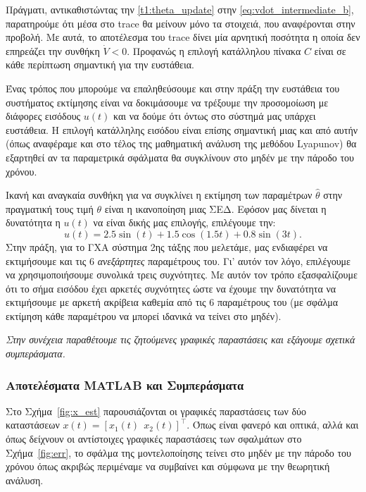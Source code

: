 \documentclass[12pt]{article} %
\numberwithin{equation}{section}  %
\begin{document}
Πράγματι, αντικαθιστώντας την \eqref{t1:theta_update} στην \eqref{eq:vdot_intermediate_b}, παρατηρούμε ότι μέσα στο trace θα μείνουν μόνο τα στοιχειά, που αναφέρονται στην προβολή. 
Με αυτά, το αποτέλεσμα του trace δίνει μία αρνητική ποσότητα η οποία δεν επηρεάζει την συνθήκη $\dot{V} < 0$.
Προφανώς η επιλογή κατάλληλου πίνακα $C$ είναι σε κάθε περίπτωση σημαντική για την ευστάθεια.

Ένας τρόπος που μπορούμε να επαληθεύσουμε και στην πράξη την ευστάθεια του συστήματος εκτίμησης 
είναι να δοκιμάσουμε να τρέξουμε την προσομοίωση με διάφορες εισόδους $u(t)$ και να δούμε ότι όντως στο σύστημά μας υπάρχει ευστάθεια.
Η επιλογή κατάλληλης εισόδου είναι επίσης σημαντική μιας και από αυτήν (όπως αναφέραμε και στο τέλος της μαθηματική ανάλυση της μεθόδου Lyapunov)
θα εξαρτηθεί αν τα παραμετρικά σφάλματα θα συγκλίνουν στο μηδέν με την πάροδο του χρόνου.  

Ικανή και αναγκαία συνθήκη για να συγκλίνει η εκτίμηση των παραμέτρων $\hat\theta$ στην πραγματική τους τιμή $\theta$ είναι η ικανοποίηση μιας ΣΕΔ.
Εφόσον μας δίνεται η δυνατότητα η $u(t)$ να είναι δικής μας επιλογής, επιλέγουμε την:
\begin{equation}\label{t1:u}
    u(t) = 2.5  \sin(t) + 1.5  \cos(1.5 t) + 0.8  \sin(3 t).
\end{equation}
Στην πράξη, για το ΓΧΑ σύστημα 2ης τάξης που μελετάμε, μας ενδιαφέρει να εκτιμήσουμε και τις $6$ \textit{ανεξάρτητες} παραμέτρους του.
Γι' αυτόν τον λόγο, επιλέγουμε να χρησιμοποιήσουμε συνολικά τρεις συχνότητες.
Με αυτόν τον τρόπο εξασφαλίζουμε ότι το σήμα εισόδου έχει αρκετές συχνότητες ώστε να έχουμε την δυνατότητα να εκτιμήσουμε με αρκετή ακρίβεια καθεμία από τις $6$ παραμέτρους του (με σφάλμα εκτίμηση κάθε παραμέτρου να μπορεί ιδανικά να τείνει στο μηδέν). 


\begin{center}
    \textit{Στην συνέχεια παραθέτουμε τις ζητούμενες γραφικές παραστάσεις και εξάγουμε σχετικά συμπεράσματα.}
\end{center}



\subsubsection{Αποτελέσματα MATLAB και Συμπεράσματα}

Στο Σχήμα~\ref{fig:x_est} παρουσιάζονται οι γραφικές παραστάσεις των δύο καταστάσεων $x(t) = [x_1(t) \ \ x_2(t)]^{\top}$.
Όπως είναι φανερό και οπτικά, αλλά και όπως δείχνουν οι αντίστοιχες γραφικές παραστάσεις των σφαλμάτων στο Σχήμα~\ref{fig:err}, 
το σφάλμα της μοντελοποίησης τείνει στο μηδέν με την πάροδο του χρόνου\textemdash 
όπως ακριβώς περιμέναμε να συμβαίνει και σύμφωνα με την θεωρητική ανάλυση. 
\end{document}
